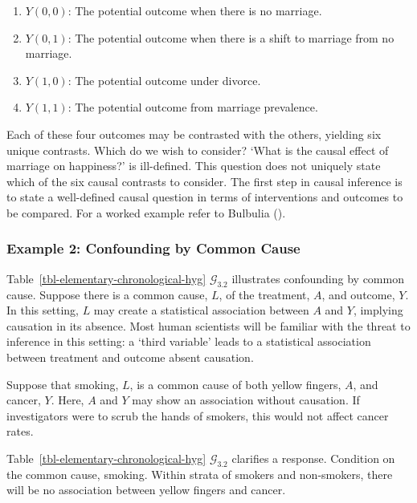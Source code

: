 \documentclass[
  single column]{article}
\providecommand{\tightlist}{%
  \setlength{\itemsep}{0pt}\setlength{\parskip}{0pt}}\usepackage{longtable,booktabs,array}
\begin{document}
\begin{enumerate}
\def\labelenumi{\arabic{enumi}.}
\tightlist
\item
  \(Y(0, 0)\): The potential outcome when there is no marriage.
\item
  \(Y(0, 1)\): The potential outcome when there is a shift to marriage
  from no marriage.
\item
  \(Y(1, 0)\): The potential outcome under divorce.
\item
  \(Y(1, 1)\): The potential outcome from marriage prevalence.
\end{enumerate}

Each of these four outcomes may be contrasted with the others, yielding
six unique contrasts. Which do we wish to consider? `What is the causal
effect of marriage on happiness?' is ill-defined. This question does not
uniquely state which of the six causal contrasts to consider. The first
step in causal inference is to state a well-defined causal question in
terms of interventions and outcomes to be compared. For a worked example
refer to Bulbulia ().

\subsubsection{Example 2: Confounding by Common
Cause}\label{example-2-confounding-by-common-cause}

Table~\ref{tbl-elementary-chronological-hyg} \(\mathcal{G}_{3.2}\)
illustrates confounding by common cause. Suppose there is a common
cause, \(L\), of the treatment, \(A\), and outcome, \(Y\). In this
setting, \(L\) may create a statistical association between \(A\) and
\(Y\), implying causation in its absence. Most human scientists will be
familiar with the threat to inference in this setting: a `third
variable' leads to a statistical association between treatment and
outcome absent causation.

Suppose that smoking, \(L\), is a common cause of both yellow fingers,
\(A\), and cancer, \(Y\). Here, \(A\) and \(Y\) may show an association
without causation. If investigators were to scrub the hands of smokers,
this would not affect cancer rates.

Table~\ref{tbl-elementary-chronological-hyg} \(\mathcal{G}_{3.2}\)
clarifies a response. Condition on the common cause, smoking. Within
strata of smokers and non-smokers, there will be no association between
yellow fingers and cancer.
\end{document}
